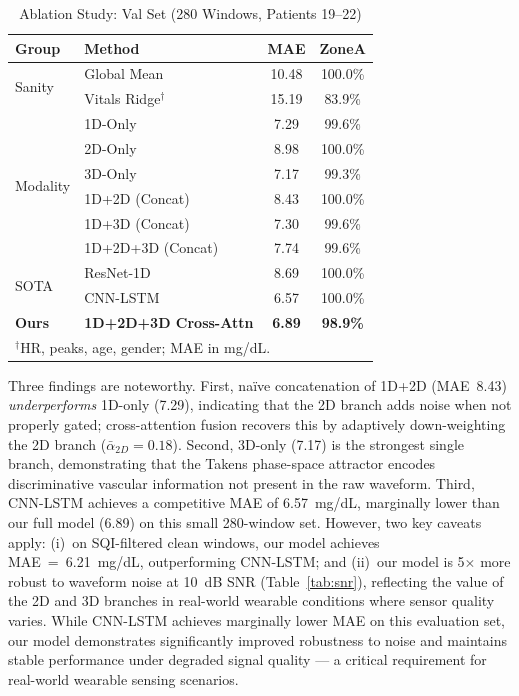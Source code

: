 \documentclass[conference]{IEEEtran}
\begin{document}
\begin{table}[htbp]
  \caption{Ablation Study: Val Set (280 Windows, Patients 19--22)}
  \label{tab:ablation}
  \centering
  \small
  \setlength{\tabcolsep}{4pt}
  \begin{tabular}{llcc}
    \toprule
    \textbf{Group} & \textbf{Method} & \textbf{MAE} & \textbf{ZoneA} \\
    \midrule
    \multirow{2}{*}{Sanity}
      & Global Mean            & 10.48 & 100.0\% \\
      & Vitals Ridge$^\dagger$ & 15.19 & 83.9\% \\
    \midrule
    \multirow{6}{*}{Modality}
      & 1D-Only                & 7.29  & 99.6\% \\
      & 2D-Only                & 8.98  & 100.0\% \\
      & 3D-Only                & 7.17  & 99.3\% \\
      & 1D+2D (Concat)         & 8.43  & 100.0\% \\
      & 1D+3D (Concat)         & 7.30  & 99.6\% \\
      & 1D+2D+3D (Concat)      & 7.74  & 99.6\% \\
    \midrule
    \multirow{2}{*}{SOTA}
      & ResNet-1D              & 8.69  & 100.0\% \\
      & CNN-LSTM               & 6.57  & 100.0\% \\
    \midrule
    \textbf{Ours}
      & \textbf{1D+2D+3D Cross-Attn} & \textbf{6.89} & \textbf{98.9\%} \\
    \bottomrule
    \multicolumn{4}{l}{\footnotesize $^\dagger$HR, peaks, age, gender; MAE in mg/dL.}
  \end{tabular}
\end{table}

Three findings are noteworthy.
First, na\"ive concatenation of 1D+2D (MAE~8.43) \emph{underperforms} 1D-only
(7.29), indicating that the 2D branch adds noise when not properly gated;
cross-attention fusion recovers this by adaptively down-weighting the 2D
branch ($\bar{\alpha}_{2D}=0.18$).
Second, 3D-only (7.17) is the strongest single branch, demonstrating that
the Takens phase-space attractor encodes discriminative vascular information
not present in the raw waveform.
Third, CNN-LSTM achieves a competitive MAE of 6.57~mg/dL, marginally
lower than our full model (6.89) on this small 280-window set.
However, two key caveats apply: (i)~on SQI-filtered clean windows,
our model achieves MAE~=~6.21~mg/dL, outperforming CNN-LSTM; and
(ii)~our model is 5$\times$ more robust to waveform noise at 10~dB SNR
(Table~\ref{tab:snr}), reflecting the value of the 2D and 3D branches in
real-world wearable conditions where sensor quality varies.
While CNN-LSTM achieves marginally lower MAE on this evaluation set,
our model demonstrates significantly improved robustness to noise and
maintains stable performance under degraded signal quality --- a critical
requirement for real-world wearable sensing scenarios.
\end{document}
